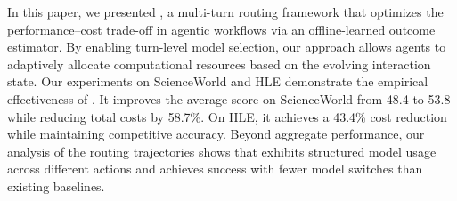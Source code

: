 
In this paper, we presented \method, a multi-turn routing framework that optimizes the performance--cost trade-off in agentic workflows via an offline-learned outcome estimator. By enabling turn-level model selection, our approach allows agents to adaptively allocate computational resources based on the evolving interaction state.
Our experiments on ScienceWorld and HLE demonstrate the empirical effectiveness of \method. It improves the average score on ScienceWorld from 48.4 to 53.8 while reducing total costs by 58.7\%. On HLE, it achieves a 43.4\% cost reduction while maintaining competitive accuracy. Beyond aggregate performance, our analysis of the routing trajectories shows that \method exhibits structured model usage across different actions and achieves success with fewer model switches than existing baselines.